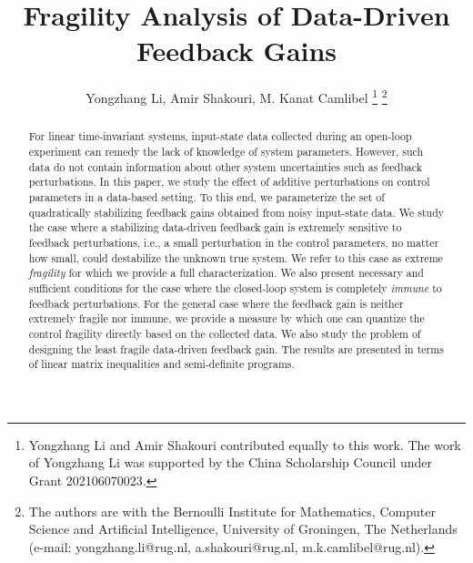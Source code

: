 \documentclass[9pt,shortpaper,twoside,web]{ieeecolor}
\begin{document}
\title{Fragility Analysis of Data-Driven Feedback Gains}
\author{Yongzhang Li, Amir Shakouri, M. Kanat Camlibel%
\thanks{Yongzhang Li and Amir Shakouri contributed equally to this work. The work of Yongzhang Li was supported by the China Scholarship Council under Grant 202106070023.}
\thanks{The authors are with the Bernoulli Institute for Mathematics, Computer Science and Artificial Intelligence, University of Groningen, The Netherlands (e-mail: yongzhang.li@rug.nl, a.shakouri@rug.nl, m.k.camlibel@rug.nl).}
}

\maketitle
\thispagestyle{empty}
\pagestyle{empty}

\begin{abstract}
For linear time-invariant systems, input-state data collected during an open-loop experiment can remedy the lack of knowledge of system parameters. However, such data do not contain information about other system uncertainties such as feedback perturbations. In this paper, we study the effect of additive perturbations on control parameters in a data-based setting.  To this end, we parameterize the set of quadratically stabilizing feedback gains obtained from noisy input-state data. We study the case where a stabilizing data-driven feedback gain is extremely sensitive to feedback perturbations, i.e., a small perturbation in the control parameters, no matter how small, could destabilize the unknown true system. We refer to this case as extreme \emph{fragility} for which we provide a full characterization. We also present necessary and sufficient conditions for the case where the closed-loop system is completely \emph{immune} to feedback perturbations. For the general case where the feedback gain is neither extremely fragile nor immune, we provide a measure by which one can quantize the control fragility directly based on the collected data. We also study the problem of designing the least fragile data-driven feedback gain. The results are presented in terms of linear matrix inequalities and semi-definite programs. 
\end{abstract}
\end{document}
